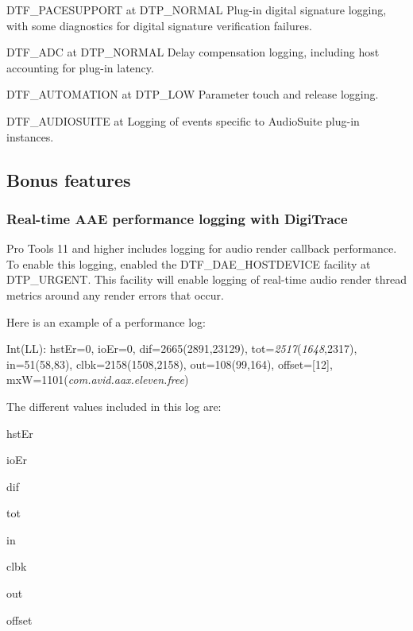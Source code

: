 \begin{DoxyItemize}
\item {\ttfamily D\+T\+F\+\_\+\+P\+A\+C\+E\+S\+U\+P\+P\+O\+RT} at {\ttfamily D\+T\+P\+\_\+\+N\+O\+R\+M\+AL} Plug-\/in digital signature logging, with some diagnostics for digital signature verification failures.  
\item {\ttfamily D\+T\+F\+\_\+\+A\+DC} at {\ttfamily D\+T\+P\+\_\+\+N\+O\+R\+M\+AL} Delay compensation logging, including host accounting for plug-\/in latency.  
\item {\ttfamily D\+T\+F\+\_\+\+A\+U\+T\+O\+M\+A\+T\+I\+ON} at {\ttfamily D\+T\+P\+\_\+\+L\+OW} Parameter touch and release logging.  
\item {\ttfamily D\+T\+F\+\_\+\+A\+U\+D\+I\+O\+S\+U\+I\+TE} at {\ttfamily } Logging of events specific to Audio\+Suite plug-\/in instances.  
\end{DoxyItemize}



 \hypertarget{a00834_digitrace__bonus_features}{}\subsection{Bonus features}\label{a00834_digitrace__bonus_features}
 \hypertarget{a00834_digitrace__performancelogging}{}\subsubsection{Real-\/time A\+A\+E performance logging with Digi\+Trace}\label{a00834_digitrace__performancelogging}
 Pro Tools 11 and higher includes logging for audio render callback performance. To enable this logging, enabled the {\ttfamily D\+T\+F\+\_\+\+D\+A\+E\+\_\+\+H\+O\+S\+T\+D\+E\+V\+I\+CE} facility at {\ttfamily D\+T\+P\+\_\+\+U\+R\+G\+E\+NT}. This facility will enable logging of real-\/time audio render thread metrics around any render errors that occur.

 Here is an example of a performance log\+:

 {\ttfamily Int(\+L\+L)\+: hst\+Er=0, io\+Er=0, dif=2665(2891,23129), tot={\itshape 2517}({\itshape 1648},2317), in=51(58,83), clbk=2158(1508,2158), out=108(99,164), offset=\mbox{[}12\mbox{]}, mxW=1101({\itshape com.\+avid.\+aax.\+eleven.\+free}) }

 The different values included in this log are\+:

 
\begin{DoxyItemize}
\item {\ttfamily hst\+Er }    
\item {\ttfamily io\+Er }    
\item {\ttfamily dif }    
\item {\ttfamily tot }    
\item {\ttfamily in }    
\item {\ttfamily clbk }    
\item {\ttfamily out }    
\item {\ttfamily offset }    
\end{DoxyItemize}

